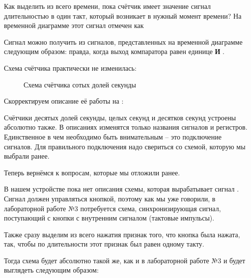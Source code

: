 \par{Как выделить из всего времени, пока счётчик имеет значение  сигнал длительностью в один такт, который возникает в нужный момент времени? На временной диаграмме этот сигнал отмечен как 

\par{Сигнал  можно получить из сигналов, представленных на временной диаграмме следующим образом:  правда, когда выход компаратора равен единице \textbf{И} .}

\par{Схема счётчика практически не изменилась:}

\begin{figure}[H]
	\centering
	\def\svgwidth{\columnwidth}
	
	\caption{Схема счётчика сотых долей секунды}
\end{figure}

\par{Скорректируем описание её работы на :}



\par{Счётчики десятых долей секунды, целых секунд и десятков секунд устроены абсолютно также. В описаниях изменятся только названия сигналов и регистров. Единственное в чем необходимо быть внимательным – это подключение сигналов. Для правильного подключения надо свериться со схемой, которую мы выбрали ранее.}

\par{Теперь вернёмся к вопросам, которые мы отложили ранее.}

\par{В нашем устройстве пока нет описания схемы, которая вырабатывает сигнал . Сигнал должен управляться кнопкой, поэтому как мы уже говорили, в лабораторной работе №3 потребуется схема, синхронизирующая сигнал, поступающий с кнопки с внутренним сигналом  (тактовые импульсы).}

\par{Также сразу выделим из всего нажатия признак того, что кнопка была нажата, так, чтобы по длительности этот признак был равен одному такту.}

\par{Тогда схема будет абсолютно такой же, как и в лабораторной работе №3 и будет выглядеть следующим образом:}

}
